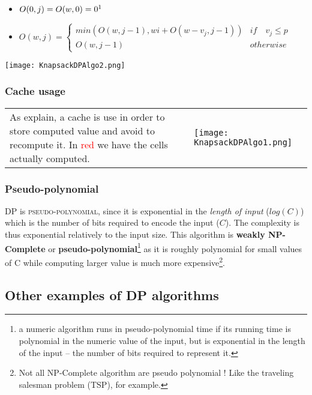 \begin{itemize}
    \begin{itemize}
    \item $O(0,j) = O(w,0) = 0 \text{\footnotemark} $
    \item $ O(w,j) = \begin{cases}
                min(O(w,j-1), wi + O(w-v_j,j-1)) & if \quad v_j \leq p \\
                O(w,j-1) & otherwise
            \end{cases}$
        \end{itemize}
        \begin{center}
            \texttt{[image: KnapsackDPAlgo2.png]}
        \end{center}
\end{itemize}

\subsubsection{Cache usage}
\begin{tabular}{m{9cm}m{6cm}}
As explain, a cache is use in order to store computed value and avoid to recompute
it. In \textcolor{red}{red} we have the cells actually computed.
&
    \texttt{[image: KnapsackDPAlgo1.png]}
\end{tabular}


\subsubsection{Pseudo-polynomial}

DP is \textsc{pseudo-polynomial}, since it is exponential in the 
\textit{length of input} ($log(C)$) which is the number of bits required to
encode the input ($C$). The complexity is thus exponential relatively to the
input size. This algorithm is \textbf{weakly NP-Complete} or
\textbf{pseudo-polynomial}\footnote{a numeric algorithm runs in
pseudo-polynomial time if its running time is polynomial in the numeric value
of the input, but is exponential in the length of the input – the number of
bits required to represent it.} as it is roughly polynomial for small values of
C while computing larger value is much more expensive\footnote{Not all
    NP-Complete algorithm are pseudo polynomial ! Like the traveling salesman
problem (TSP), for example.}.


\subsection{Other examples of DP algorithms}

